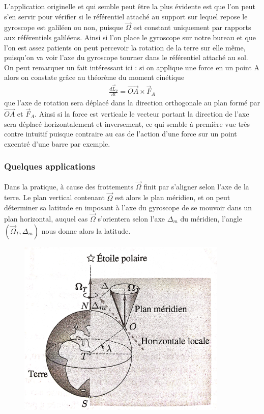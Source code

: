 \documentclass[12pt,prb,aps,epsf]{article}
\begin{document}
L'application originelle et qui semble peut être la plus évidente est que l'on peut s'en servir pour vérifier si le référentiel attaché au support sur lequel repose le gyroscope est galiléen ou non, puisque $\vec{\Omega}$ est constant uniquement par rapports aux référentiels galiléens. Ainsi si l'on place le gyroscope sur notre bureau et que l'on est assez patients on peut percevoir la rotation de la terre sur elle même, puisqu'on va voir l'axe du gyroscope tourner dans le référentiel attaché au sol.\\

On peut remarquer un fait intéressant ici : si on applique une force en un point A alors on constate grâce au théorème du moment cinétique 
\begin{eqnarray}
\frac{d\vec{L}_o}{dt}  = \vec{OA}\times \vec{F}_A
\end{eqnarray}
que l'axe de rotation sera déplacé dans la direction orthogonale au plan formé par $\vec{OA}$ et $\vec{F}_A$. Ainsi si la force est verticale le vecteur portant la direction de l'axe sera déplacé horizontalement et inversement, ce qui semble à première vue très contre intuitif puisque contraire au cas de l'action d'une force sur un point excentré d'une barre par exemple.

\subsubsection{Quelques applications}
Dans la pratique, à cause des frottements $\vec{\Omega}$ finit par s'aligner selon l'axe de la terre. Le plan vertical contenant $\vec{\Omega}$ est alors le plan méridien, et on peut déterminer sa latitude en imposant à l'axe du gyroscope de se mouvoir dans un plan horizontal, auquel cas $\vec{\Omega}$ s'orientera selon l'axe $\Delta_m$ du méridien, l'angle $(\vec{\Omega}_T,\Delta_m)$ nous donne alors la latitude.

\begin{figure}[h]
	\centerline{\includegraphics[width=10cm]{compas}}
\end{figure}
\end{document}
